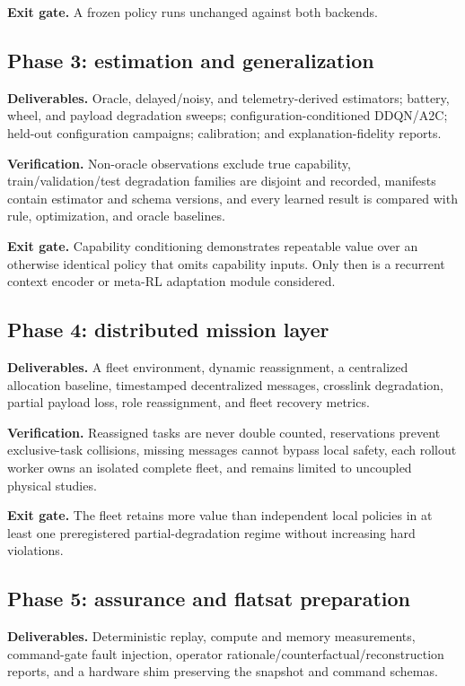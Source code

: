 \documentclass[11pt]{article}
\newcommand{\code}[1]{\texttt{\detokenize{#1}}}
\begin{document}
\textbf{Exit gate.}
A frozen policy runs unchanged against both backends.

\subsection{Phase 3: estimation and generalization}

\textbf{Deliverables.}
Oracle, delayed/noisy, and telemetry-derived estimators; battery, wheel, and
payload degradation sweeps; configuration-conditioned DDQN/A2C; held-out
configuration campaigns; calibration; and explanation-fidelity reports.

\textbf{Verification.}
Non-oracle observations exclude true capability, train/validation/test
degradation families are disjoint and recorded, manifests contain estimator
and schema versions, and every learned result is compared with rule,
optimization, and oracle baselines.

\textbf{Exit gate.}
Capability conditioning demonstrates repeatable value over an otherwise
identical policy that omits capability inputs.  Only then is a recurrent
context encoder or meta-RL adaptation module considered.

\subsection{Phase 4: distributed mission layer}

\textbf{Deliverables.}
A fleet environment, dynamic reassignment, a centralized allocation baseline,
timestamped decentralized messages, crosslink degradation, partial payload
loss, role reassignment, and fleet recovery metrics.

\textbf{Verification.}
Reassigned tasks are never double counted, reservations prevent exclusive-task
collisions, missing messages cannot bypass local safety, each rollout worker
owns an isolated complete fleet, and \code{run_constellation_ensemble} remains
limited to uncoupled physical studies.

\textbf{Exit gate.}
The fleet retains more value than independent local policies in at least one
preregistered partial-degradation regime without increasing hard violations.

\subsection{Phase 5: assurance and flatsat preparation}

\textbf{Deliverables.}
Deterministic replay, compute and memory measurements, command-gate fault
injection, operator rationale/counterfactual/reconstruction reports, and a
hardware shim preserving the snapshot and command schemas.
\end{document}
